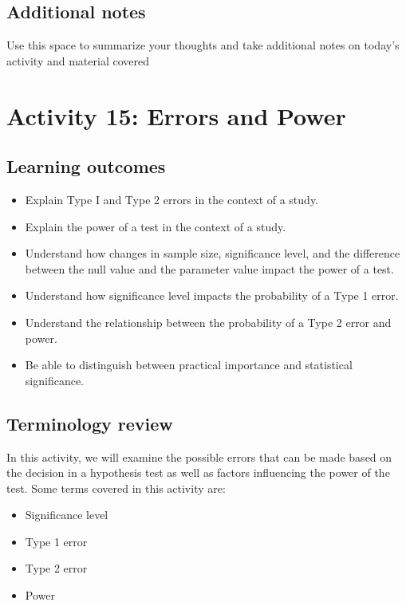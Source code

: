 \documentclass[
]{report}
\begin{document}
\subsection{Additional notes}\label{additional-notes-13}

Use this space to summarize your thoughts and take additional notes on today's activity and material covered

\newpage

\section{Activity 15: Errors and Power}\label{activity-15-errors-and-power}


\subsection{Learning outcomes}\label{learning-outcomes-15}

\begin{itemize}
\item
  Explain Type I and Type 2 errors in the context of a study.
\item
  Explain the power of a test in the context of a study.
\item
  Understand how changes in sample size, significance level, and the difference between the null value and the parameter value impact the power of a test.
\item
  Understand how significance level impacts the probability of a Type 1 error.
\item
  Understand the relationship between the probability of a Type 2 error and power.
\item
  Be able to distinguish between practical importance and statistical significance.
\end{itemize}

\subsection{Terminology review}\label{terminology-review-13}

In this activity, we will examine the possible errors that can be made based on the decision in a hypothesis test as well as factors influencing the power of the test. Some terms covered in this activity are:

\begin{itemize}
\item
  Significance level
\item
  Type 1 error
\item
  Type 2 error
\item
  Power
\end{itemize}
\end{document}
